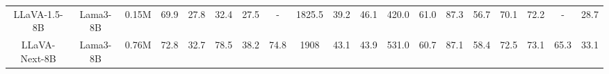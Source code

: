 \begin{table*}[ht]
{\begin{tabular}{ccc|cccccccccccccccc}
        LLaVA-1.5-8B & \hspace{-0.9em}Lama3-8B & \hspace{-0.9em}0.15M & \hspace{-0.5em}69.9 & \hspace{-0.9em}27.8 & \hspace{-0.9em}32.4 & \hspace{-0.9em}27.5 & \hspace{-0.9em}- & \hspace{-0.9em}1825.5 & \hspace{-0.9em}39.2 & \hspace{-0.9em}46.1 & \hspace{-0.9em}420.0 & \hspace{-0.9em}61.0 & \hspace{-0.9em}87.3 & \hspace{-0.9em}56.7 & \hspace{-0.9em}70.1 & \hspace{-0.9em}72.2 & \hspace{-0.9em}- & \hspace{-0.9em}28.7 \\ 
        LLaVA-Next-8B & \hspace{-0.9em}Lama3-8B & \hspace{-0.9em}0.76M & \hspace{-0.5em}72.8 & \hspace{-0.9em}32.7 & \hspace{-0.9em}78.5 & \hspace{-0.9em}38.2 & \hspace{-0.9em}74.8 & \hspace{-0.9em}1908 & \hspace{-0.9em}43.1 & \hspace{-0.9em}43.9 & \hspace{-0.9em}531.0 & \hspace{-0.9em}60.7 & \hspace{-0.9em}87.1 & \hspace{-0.9em}58.4 & \hspace{-0.9em}72.5 & \hspace{-0.9em}73.1 & \hspace{-0.9em}65.3 & \hspace{-0.9em}33.1 \\ 

\end{tabular}}
\end{table*}
